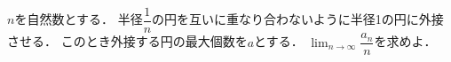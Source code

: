 \documentclass[../../main.tex]{subfiles}
\begin{document}
$n$を自然数とする．
半径$\displaystyle\dfrac{1}{n}$の円を互いに重なり合わないように半径1の円に外接させる．
このとき外接する円の最大個数を$a$とする．
$\displaystyle\lim_{n\to\infty}\dfrac{a_n}{n}$を求めよ．
\end{document}
